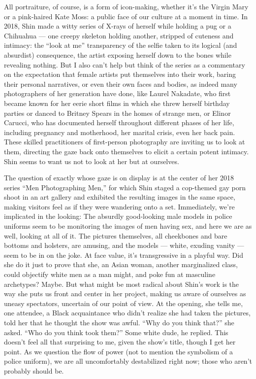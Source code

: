 All portraiture, of course, is a form of icon-making, whether it's the
Virgin Mary or a pink-haired Kate Moss: a public face of our culture at
a moment in time. In 2018, Shin made a witty series of X-rays of herself
while holding a pug or a Chihuahua --- one creepy skeleton holding
another, stripped of cuteness and intimacy: the ``look at me''
transparency of the selfie taken to its logical (and absurdist)
consequence, the artist exposing herself down to the bones while
revealing nothing. But I also can't help but think of the series as a
commentary on the expectation that female artists put themselves into
their work, baring their personal narratives, or even their own faces
and bodies, as indeed many photographers of her generation have done,
like Laurel Nakadate, who first became known for her eerie short films
in which she threw herself birthday parties or danced to Britney Spears
in the homes of strange men, or Elinor Carucci, who has documented
herself throughout different phases of her life, including pregnancy and
motherhood, her marital crisis, even her back pain. These skilled
practitioners of first-person photography are inviting us to look at
them, directing the gaze back onto themselves to elicit a certain potent
intimacy. Shin seems to want us not to look at her but at ourselves.

The question of exactly whose gaze is on display is at the center of her
2018 series ``Men Photographing Men,'' for which Shin staged a
cop-themed gay porn shoot in an art gallery and exhibited the resulting
images in the same space, making visitors feel as if they were wandering
onto a set. Immediately, we're implicated in the looking: The absurdly
good-looking male models in police uniforms seem to be monitoring the
images of men having sex, and here we are as well, looking at all of it.
The pictures themselves, all cheekbones and bare bottoms and holsters,
are amusing, and the models --- white, exuding vanity --- seem to be in
on the joke. At face value, it's transgressive in a playful way. Did she
do it just to prove that she, an Asian woman, another marginalized
class, could objectify white men as a man might, and poke fun at
masculine archetypes? Maybe. But what might be most radical about Shin's
work is the way she puts us front and center in her project, making us
aware of ourselves as uneasy spectators, uncertain of our point of view.
At the opening, she tells me, one attendee, a Black acquaintance who
didn't realize she had taken the pictures, told her that he thought the
show was awful. ``Why do you think that?'' she asked. ``Who do you think
took them?'' Some white dude, he replied. This doesn't feel all that
surprising to me, given the show's title, though I get her point. As we
question the flow of power (not to mention the symbolism of a police
uniform), we are all uncomfortably destabilized right now; those who
aren't probably should be.

